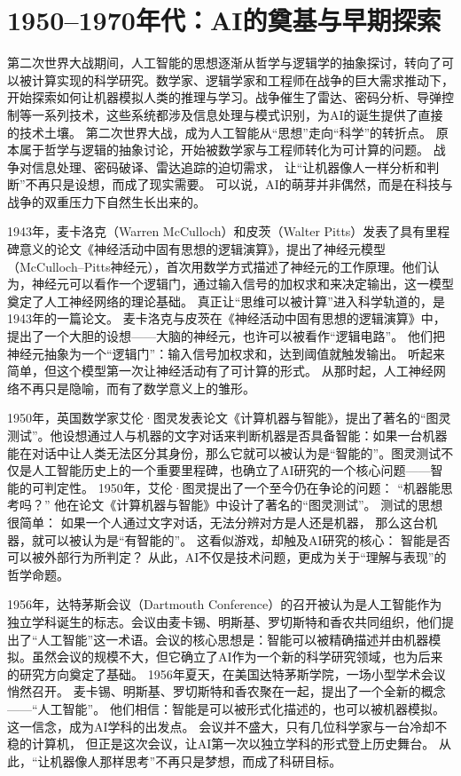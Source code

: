 \section{1950–1970年代：AI的奠基与早期探索}

第二次世界大战期间，人工智能的思想逐渐从哲学与逻辑学的抽象探讨，转向了可以被计算实现的科学研究。数学家、逻辑学家和工程师在战争的巨大需求推动下，开始探索如何让机器模拟人类的推理与学习。战争催生了雷达、密码分析、导弹控制等一系列技术，这些系统都涉及信息处理与模式识别，为AI的诞生提供了直接的技术土壤。
第二次世界大战，成为人工智能从“思想”走向“科学”的转折点。  
原本属于哲学与逻辑的抽象讨论，开始被数学家与工程师转化为可计算的问题。  
战争对信息处理、密码破译、雷达追踪的迫切需求，  
让“让机器像人一样分析和判断”不再只是设想，而成了现实需要。  
可以说，AI的萌芽并非偶然，而是在科技与战争的双重压力下自然生长出来的。  

1943年，麦卡洛克（Warren McCulloch）和皮茨（Walter Pitts）发表了具有里程碑意义的论文《神经活动中固有思想的逻辑演算》，提出了神经元模型（McCulloch–Pitts神经元），首次用数学方式描述了神经元的工作原理。他们认为，神经元可以看作一个逻辑门，通过输入信号的加权求和来决定输出，这一模型奠定了人工神经网络的理论基础。
真正让“思维可以被计算”进入科学轨道的，是1943年的一篇论文。  
麦卡洛克与皮茨在《神经活动中固有思想的逻辑演算》中，  
提出了一个大胆的设想——大脑的神经元，也许可以被看作“逻辑电路”。  
他们把神经元抽象为一个“逻辑门”：输入信号加权求和，达到阈值就触发输出。  
听起来简单，但这个模型第一次让神经活动有了可计算的形式。  
从那时起，人工神经网络不再只是隐喻，而有了数学意义上的雏形。  

1950年，英国数学家艾伦·图灵发表论文《计算机器与智能》，提出了著名的“图灵测试”。他设想通过人与机器的文字对话来判断机器是否具备智能：如果一台机器能在对话中让人类无法区分其身份，那么它就可以被认为是“智能的”。图灵测试不仅是人工智能历史上的一个重要里程碑，也确立了AI研究的一个核心问题——智能的可判定性。
1950年，艾伦·图灵提出了一个至今仍在争论的问题：  
“机器能思考吗？”  
他在论文《计算机器与智能》中设计了著名的“图灵测试”。  
测试的思想很简单：  
如果一个人通过文字对话，无法分辨对方是人还是机器，  
那么这台机器，就可以被认为是“有智能的”。  
这看似游戏，却触及AI研究的核心：  
智能是否可以被外部行为所判定？  
从此，AI不仅是技术问题，更成为关于“理解与表现”的哲学命题。  

1956年，达特茅斯会议（Dartmouth Conference）的召开被认为是人工智能作为独立学科诞生的标志。会议由麦卡锡、明斯基、罗切斯特和香农共同组织，他们提出了“人工智能”这一术语。会议的核心思想是：智能可以被精确描述并由机器模拟。虽然会议的规模不大，但它确立了AI作为一个新的科学研究领域，也为后来的研究方向奠定了基础。
1956年夏天，在美国达特茅斯学院，一场小型学术会议悄然召开。  
麦卡锡、明斯基、罗切斯特和香农聚在一起，提出了一个全新的概念——“人工智能”。  
他们相信：智能是可以被形式化描述的，也可以被机器模拟。  
这一信念，成为AI学科的出发点。  
会议并不盛大，只有几位科学家与一台冷却不稳的计算机，  
但正是这次会议，让AI第一次以独立学科的形式登上历史舞台。  
从此，“让机器像人那样思考”不再只是梦想，而成了科研目标。  

